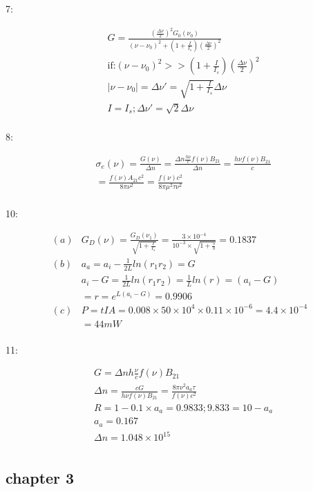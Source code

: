 \documentclass{article}
\begin{document}
7:

\begin{align*}
&G=\frac{(\frac{\Delta\nu}{2})^2G_0(\nu_0)}{(\nu-\nu_0)^2+(1+\frac{I}{I_s})(\frac{\Delta\nu}2)^2}\\
&\text{if:}(\nu-\nu_0)^2>>(1+\frac{I}{I_s})(\frac{\Delta\nu}2)^2\\
&|\nu-\nu_0|=\Delta\nu'=\sqrt{1+\frac{I}{I_s}}\Delta\nu\\
&I=I_s;\Delta\nu'=\sqrt{2}\Delta\nu\\
\end{align*}

8:

\begin{align*}
&\sigma_e(\nu)=\frac{G(\nu)}{\Delta n}=\frac{\Delta n\frac{h\nu}cf(\nu)B_{21}}{\Delta n}=\frac{h\nu f(\nu)B_{21}}{c}\\
&=\frac{ f(\nu)A_{21}c^2}{ 8\pi \nu^2}=\frac{f(\nu)c^2}{8\pi\mu^2\tau\nu^2}\\
\end{align*}

10:

\begin{align*}
  (a)&G_D(\nu)=\frac{G_D(\nu_1)}{\sqrt{1+\frac{I}{I_s}}}=\frac{3 \times 10^{-4}}{10^{-3} \times \sqrt{1+\frac{5}{3}}}=0.1837\\
  (b)&a_a=a_i-\frac1{2L}ln(r_1r_2)=G\\
     &a_i-G=\frac1{2L}ln(r_1r_2)=\frac1Lln(r)=(a_i-G)\\
     &=r=e^{L(a_i-G)}=0.9906\\
  (c)&P=tIA=0.008 \times 50 \times 10^{4} \times 0.11 \times 10^{-6}=4.4 \times 10^{-4}\\
     &=44mW\\
\end{align*}

11:

\begin{align*}
&G=\Delta n h\frac{\nu}{c}f(\nu)B_{21}\\
&\Delta n=\frac{cG}{h\nu f(\nu)B_{21}}=\frac{8\pi \nu^2a_a\tau}{ f(\nu)c^2}\\
&R=1-0.1 \times a_a=0.9833;9.833=10- a_a\\
&a_a=0.167\\
&\Delta n=1.048 \times 10^{15}\\
\end{align*}

\subsection{chapter 3}
\end{document}
